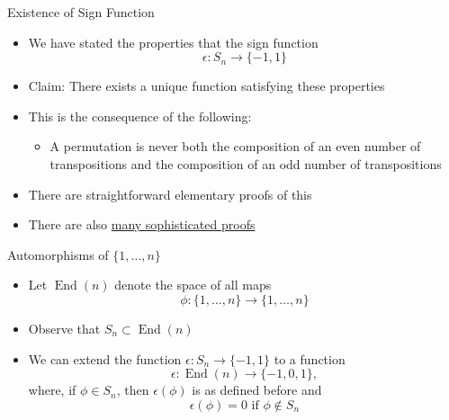 \documentclass[usenames,dvipsnames,10pt]{beamer}
\newcommand{\End}{\operatorname{End}}
\begin{document}
\begin{frame}
  {Existence of Sign Function}

  \begin{itemize}
  \item We have stated the properties that the sign function
    \[ \epsilon: S_n \rightarrow \{-1,1\} \]
  \item Claim: There exists a unique function satisfying these properties
  \item This is the consequence of the following:
    \begin{itemize}
    \item A permutation is never both the composition of an even number of transpositions and the composition of an odd number of transpositions
    \end{itemize}
  \item There are straightforward elementary proofs of this
  \item There are also \href{https://mathoverflow.net/questions/417690/conceptual-reason-why-the-sign-of-a-permutation-is-well-defined}{many sophisticated proofs}
  \end{itemize}
\end{frame}

\begin{frame}
  {Automorphisms of $\{1, \dots, n\}$}

  \begin{itemize}
  \item Let $\End(n)$ denote the space of all maps
    \[
      \phi: \{1, \dots, n\} \rightarrow \{1, \dots, n\}
    \]
  \item Observe that $S_n \subset \End(n)$
  \item We can extend the function $\epsilon: S_n \rightarrow \{-1,1\}$ to a function
    \[
      \epsilon: \End(n) \rightarrow \{-1,0,1\},
    \]
    where, if $\phi \in S_n$, then $\epsilon(\phi)$ is as defined before and
    \[
      \epsilon(\phi) = 0\text{ if }\phi \notin S_n
    \]
  \end{itemize}
\end{frame}
\end{document}
